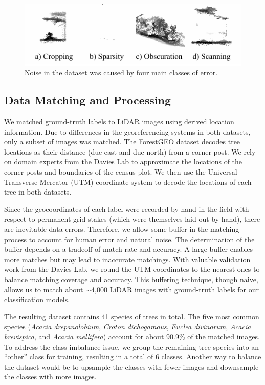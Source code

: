 \documentclass[letterpaper]{article} %
\begin{document}
\begin{figure}
    \centering
    \includegraphics[width=\columnwidth]{bad.pdf}
    \caption{Noise in the dataset was caused by four main classes of error.}
    \label{bad:species}
\end{figure}

\subsection{Data Matching and Processing}

We matched ground-truth labels to LiDAR images using derived location information. Due to differences in the georeferencing systems in both datasets, only a subset of images was matched. The ForestGEO dataset decodes tree locations as their distance (due east and due north) from a corner post. We rely on domain experts from the Davies Lab to approximate the locations of the corner posts and boundaries of the census plot. We then use the Universal Transverse Mercator (UTM) coordinate system to decode the locations of each tree in both datasets. 

Since the geocoordinates of each label were recorded by hand in the field with respect to permanent grid stakes (which were themselves laid out by hand), there are inevitable data errors. Therefore, we allow some buffer in the matching process to account for human error and natural noise. The determination of the buffer depends on a tradeoff of match rate and accuracy. A large buffer enables more matches but may lead to inaccurate matchings. With valuable validation work from the Davies Lab, we round the UTM coordinates to the nearest ones to balance matching coverage and accuracy. This buffering technique, though naive, allows us to match about $\sim$4,000 LiDAR images with ground-truth labels for our classification models.

The resulting dataset contains 41 species of trees in total. The five most common species (\textit{Acacia drepanolobium}, \textit{Croton dichogamous}, \textit{Euclea divinorum}, \textit{Acacia brevispica}, and \textit{Acacia mellifera}) account for about 90.9\% of the matched images. To address the class imbalance issue, we group the remaining tree species into an ``other'' class for training, resulting in a total of 6 classes. Another way to balance the dataset would be to upsample the classes with fewer images and downsample the classes with more images.
\end{document}
